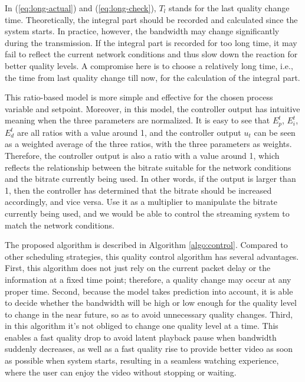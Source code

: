 \documentclass[journal]{IEEEtran}
\begin{document}
In (\ref{eq:long-actual}) and (\ref{eq:long-check}), $T_l$ stands for the last quality change time. Theoretically, the integral part should be recorded and calculated since the system starts. In practice, however, the bandwidth may change significantly during the transmission. If the integral part is recorded for too long time, it may fail to reflect the current network conditions and thus slow down the reaction for better quality levels. A compromise here is to choose a relatively long time, i.e., the time from last quality change till now, for the calculation of the integral part.

This ratio-based model is more simple and effective for the chosen process variable and setpoint. Moreover, in this model, the controller output has intuitive meaning when the three parameters are normalized. It is easy to see that $E_p^t$, $E_i^t$, $E_d^t$ are all ratios with a value around 1, and the controller output $u_t$ can be seen as a weighted average of the three ratios, with the three parameters as weights. Therefore, the controller output is also a ratio with a value around 1, which reflects the relationship between the bitrate suitable for the network conditions and the bitrate currently being used. In other words, if the output is larger than 1, then the controller has determined that the bitrate should be increased accordingly, and vice versa. Use it as a multiplier to manipulate the bitrate currently being used, and we would be able to control the streaming system to match the network conditions.

The proposed algorithm is described in Algorithm \ref{algo:control}. Compared to other scheduling strategies, this quality control algorithm has several advantages. First, this algorithm does not just rely on the current packet delay or the information at a fixed time point; therefore, a quality change may occur at any proper time. Second, because the model takes prediction into account, it is able to decide whether the bandwidth will be high or low enough for the quality level to change in the near future, so as to avoid unnecessary quality changes. Third, in this algorithm it's not obliged to change one quality level at a time. This enables a fast quality drop to avoid latent playback pause when bandwidth suddenly decreases, as well as a fast quality rise to provide better video as soon as possible when system starts, resulting in a seamless watching experience, where the user can enjoy the video without stopping or waiting.
\end{document}
